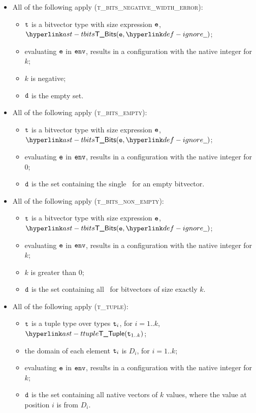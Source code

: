 \begin{itemize}
  \item All of the following apply (\textsc{t\_bits\_negative\_width\_error}):
  \begin{itemize}
    \item $\texttt{t}$ is a bitvector type with size expression $\texttt{e}$, $\TBits(\ve, \Ignore)$;
    \item evaluating $\texttt{e}$ in $\texttt{env}$, results in a configuration with the native integer for $k$;
    \item $k$ is negative;
    \item $\texttt{d}$ is the empty set.
  \end{itemize}

  \item All of the following apply (\textsc{t\_bits\_empty}):
  \begin{itemize}
    \item $\texttt{t}$ is a bitvector type with size expression $\texttt{e}$, $\TBits(\ve, \Ignore)$;
    \item evaluating $\texttt{e}$ in $\texttt{env}$, results in a configuration with the native integer for $0$;
    \item $\texttt{d}$ is the set containing the single \nativevalue\ for an empty bitvector.
  \end{itemize}

  \item All of the following apply (\textsc{t\_bits\_non\_empty}):
  \begin{itemize}
    \item $\texttt{t}$ is a bitvector type with size expression $\texttt{e}$, $\TBits(\ve, \Ignore)$;
    \item evaluating $\texttt{e}$ in $\texttt{env}$, results in a configuration with the native integer for $k$;
    \item $k$ is greater than $0$;
    \item $\texttt{d}$ is the set containing all \nativevalues\ for bitvectors of size exactly $k$.
  \end{itemize}

  \item All of the following apply (\textsc{t\_tuple}):
  \begin{itemize}
    \item $\texttt{t}$ is a tuple type over types $\texttt{t}_i$, for $i=1..k$, $\TTuple(\vt_{1..k})$;
    \item the domain of each element $\texttt{t}_i$ is $D_i$, for $i=1..k$;
    \item evaluating $\texttt{e}$ in $\texttt{env}$, results in a configuration with the native integer for $k$;
    \item $\texttt{d}$ is the set containing all native vectors of $k$ values, where the value at position $i$
    is from $D_i$.
  \end{itemize}


\end{itemize}
